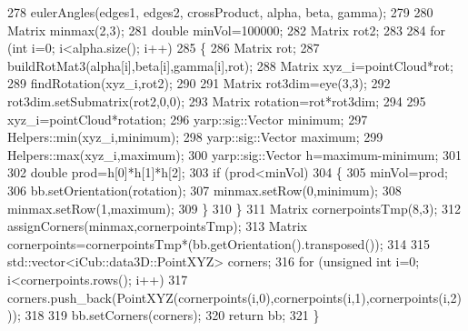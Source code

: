 \begin{DoxyCode}
278     eulerAngles(edges1, edges2, crossProduct, alpha, beta, gamma);
279 
280     Matrix minmax(2,3);
281     \textcolor{keywordtype}{double} minVol=100000;
282     Matrix rot2;
283 
284     \textcolor{keywordflow}{for} (\textcolor{keywordtype}{int} i=0; i<alpha.size(); i++)
285     \{
286         Matrix rot;
287         buildRotMat3(alpha[i],beta[i],gamma[i],rot);
288         Matrix xyz\_i=pointCloud*rot;
289         findRotation(xyz\_i,rot2);
290 
291         Matrix rot3dim=eye(3,3);
292         rot3dim.setSubmatrix(rot2,0,0);
293         Matrix rotation=rot*rot3dim;
294 
295         xyz\_i=pointCloud*rotation;
296         yarp::sig::Vector minimum;
297         Helpers::min(xyz\_i,minimum);
298         yarp::sig::Vector maximum;
299         Helpers::max(xyz\_i,maximum);
300         yarp::sig::Vector h=maximum-minimum;
301 
302         \textcolor{keywordtype}{double} prod=h[0]*h[1]*h[2];
303         \textcolor{keywordflow}{if} (prod<minVol)
304         \{
305             minVol=prod;
306             bb.setOrientation(rotation);
307             minmax.setRow(0,minimum);
308             minmax.setRow(1,maximum);
309         \}
310     \}
311     Matrix cornerpointsTmp(8,3);
312     assignCorners(minmax,cornerpointsTmp);
313     Matrix cornerpoints=cornerpointsTmp*(bb.getOrientation().transposed());
314 
315     std::vector<iCub::data3D::PointXYZ> corners;
316     \textcolor{keywordflow}{for} (\textcolor{keywordtype}{unsigned} \textcolor{keywordtype}{int} i=0; i<cornerpoints.rows(); i++)
317         corners.push\_back(PointXYZ(cornerpoints(i,0),cornerpoints(i,1),cornerpoints(i,2)));
318 
319     bb.setCorners(corners);
320     \textcolor{keywordflow}{return} bb;
321 \}
\end{DoxyCode}
